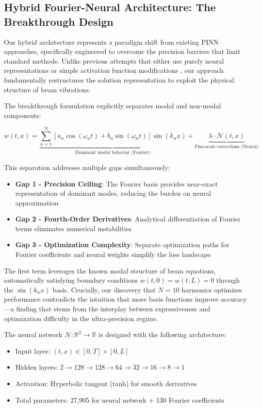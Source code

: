 \subsection{Hybrid Fourier-Neural Architecture: The Breakthrough Design}

Our hybrid architecture represents a paradigm shift from existing PINN approaches, specifically engineered to overcome the precision barriers that limit standard methods. Unlike previous attempts that either use purely neural representations \cite{raissi2019physics} or simple activation function modifications \cite{wong2022learning}, our approach fundamentally restructures the solution representation to exploit the physical structure of beam vibrations.

The breakthrough formulation explicitly separates modal and non-modal components:

\begin{equation}
w(t,x) = \underbrace{\sum_{n=1}^{N} \left[a_n \cos(\omega_n t) + b_n \sin(\omega_n t)\right] \sin(k_n x)}_{\text{Dominant modal behavior (Fourier)}} + \underbrace{\lambda \cdot \mathcal{N}(t,x)}_{\text{Fine-scale corrections (Neural)}}
\label{eq:hybrid_solution}
\end{equation}

This separation addresses multiple gaps simultaneously:
\begin{itemize}
    \item \textbf{Gap 1 - Precision Ceiling}: The Fourier basis provides near-exact representation of dominant modes, reducing the burden on neural approximation
    \item \textbf{Gap 2 - Fourth-Order Derivatives}: Analytical differentiation of Fourier terms eliminates numerical instabilities
    \item \textbf{Gap 3 - Optimization Complexity}: Separate optimization paths for Fourier coefficients and neural weights simplify the loss landscape
\end{itemize}

The first term leverages the known modal structure of beam equations, automatically satisfying boundary conditions $w(t,0) = w(t,L) = 0$ through the $\sin(k_n x)$ basis. Crucially, our discovery that $N=10$ harmonics optimizes performance contradicts the intuition that more basis functions improve accuracy—a finding that stems from the interplay between expressiveness and optimization difficulty in the ultra-precision regime.

The neural network $\mathcal{N}: \mathbb{R}^2 \rightarrow \mathbb{R}$ is designed with the following architecture:
\begin{itemize}
    \item Input layer: $(t, x) \in [0, T] \times [0, L]$
    \item Hidden layers: $2 \rightarrow 128 \rightarrow 128 \rightarrow 64 \rightarrow 32 \rightarrow 16 \rightarrow 8 \rightarrow 1$
    \item Activation: Hyperbolic tangent (tanh) for smooth derivatives
    \item Total parameters: 27,905 for neural network + 130 Fourier coefficients
\end{itemize}

